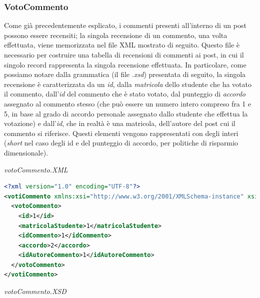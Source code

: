 \documentclass [a4paper,11pt]{book}
\begin{document}
\medskip

\subsubsection{VotoCommento}

Come già precedentemente esplicato, i commenti presenti all'interno di un post possono essere recensiti; la singola recensione di un commento, una volta effettuata, viene memorizzata nel file XML mostrato di seguito. Questo file è necessario per costruire una tabella di recensioni di commenti ai post, in cui il singolo record rappresenta la singola recensione effettuata. In particolare, come possiamo notare dalla grammatica (il file \emph{.xsd}) presentata di seguito, la singola recensione è caratterizzata da un \emph{id}, dalla \emph{matricola} dello studente che ha votato il commento, dall'\emph{id} del commento che è stato votato, dal punteggio di \emph{accordo} assegnato al commento stesso (che può essere un numero intero compreso fra 1 e 5, in base al grado di accordo personale assegnato dallo studente che effettua la votazione) e dall'\emph{id}, che in realtà è una matricola, dell'autore del post cui il commento si riferisce. Questi elementi vengono rappresentati con degli interi (\emph{short} nel caso degli id e del punteggio di accordo, per politiche di risparmio dimensionale).

\medskip

\emph{votoCommento.XML}

\label{sec:votoCommento}

\begin{lstlisting}[language=XML]
<?xml version="1.0" encoding="UTF-8"?>
<votiCommento xmlns:xsi="http://www.w3.org/2001/XMLSchema-instance" xsi:noNamespaceSchemaLocation="votoCommento.xsd">
  <votoCommento>
    <id>1</id>
    <matricolaStudente>1</matricolaStudente>
    <idCommento>1</idCommento>
    <accordo>2</accordo>
    <idAutoreCommento>1</idAutoreCommento>
  </votoCommento>
</votiCommento>
\end{lstlisting}

\emph{votoCommento.XSD}
\end{document}
